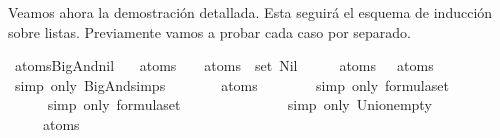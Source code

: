 \begin{isabellebody}
\begin{isamarkuptext}
  Veamos ahora la demostración detallada. Esta seguirá el esquema de 
  inducción sobre listas. Previamente vamos a probar cada caso por
  separado.%
\end{isamarkuptext}\isamarkuptrue%
\isamarkupfalse%
\ atoms{\isacharunderscore}BigAnd{\isacharunderscore}nil{\isacharcolon}\ \isanewline
\ \ {\isachardoublequoteopen}atoms\ {\isacharparenleft}\isactrlbold {\isasymAnd}{\isacharbrackleft}{\isacharbrackright}{\isacharparenright}\ {\isacharequal}\ {\isasymUnion}\ {\isacharparenleft}atoms\ {\isacharbackquote}\ set\ Nil{\isacharparenright}{\isachardoublequoteclose}\isanewline
%
\isadelimproof
%
\endisadelimproof
%
\isatagproof
{}\isamarkupfalse%
\ {\isacharminus}\isanewline
\ \ \isamarkupfalse%
\ {\isachardoublequoteopen}atoms\ {\isacharparenleft}\isactrlbold {\isasymAnd}{\isacharbrackleft}{\isacharbrackright}{\isacharparenright}\ {\isacharequal}\ atoms\ {\isacharparenleft}\isactrlbold {\isasymnot}\ {\isasymbottom}{\isacharparenright}{\isachardoublequoteclose}\ \isanewline
\ \ \ \ \isamarkupfalse%
\ {\isacharparenleft}simp\ only{\isacharcolon}\ BigAnd{\isachardot}simps{\isacharparenleft}{}{\isacharparenright}{\isacharparenright}\isanewline
\ \ \isamarkupfalse%
\ \isamarkupfalse%
\ {\isachardoublequoteopen}{\isasymdots}\ {\isacharequal}\ atoms\ {\isasymbottom}{\isachardoublequoteclose}\ \isanewline
\ \ \ \ \isamarkupfalse%
\ {\isacharparenleft}simp\ only{\isacharcolon}\ formula{\isachardot}set{\isacharparenleft}{}{\isacharparenright}{\isacharparenright}\isanewline
\ \ \isamarkupfalse%
\ \isamarkupfalse%
\ {\isachardoublequoteopen}{\isasymdots}\ {\isacharequal}\ {\isasymemptyset}{\isachardoublequoteclose}\ \isanewline
\ \ \ \ \isamarkupfalse%
\ {\isacharparenleft}simp\ only{\isacharcolon}\ formula{\isachardot}set{\isacharparenleft}{}{\isacharparenright}{\isacharparenright}\isanewline
\ \ \isamarkupfalse%
\ \isamarkupfalse%
\ {\isachardoublequoteopen}{\isasymdots}\ {\isacharequal}\ {\isasymUnion}\ {\isasymemptyset}{\isachardoublequoteclose}\isanewline
\ \ \ \ \isamarkupfalse%
\ {\isacharparenleft}simp\ only{\isacharcolon}\ Union{\isacharunderscore}empty{\isacharparenright}\isanewline
\ \ \isamarkupfalse%
\ \isamarkupfalse%
\ {\isachardoublequoteopen}{\isasymdots}\ {\isacharequal}\ \ {\isasymUnion}\ {\isacharparenleft}atoms\ {\isacharbackquote}\ {\isasymemptyset}{\isacharparenright}{\isachardoublequoteclose}\isanewline

\end{isabellebody}

